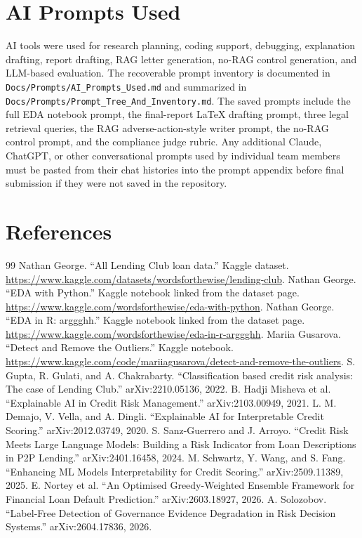 \documentclass[11pt]{article}
\begin{document}
\section{AI Prompts Used}
AI tools were used for research planning, coding support, debugging, explanation drafting, report drafting, RAG letter generation, no-RAG control generation, and LLM-based evaluation. The recoverable prompt inventory is documented in \texttt{Docs/Prompts/AI\_Prompts\_Used.md} and summarized in \texttt{Docs/Prompts/Prompt\_Tree\_And\_Inventory.md}. The saved prompts include the full EDA notebook prompt, the final-report LaTeX drafting prompt, three legal retrieval queries, the RAG adverse-action-style writer prompt, the no-RAG control prompt, and the compliance judge rubric. Any additional Claude, ChatGPT, or other conversational prompts used by individual team members must be pasted from their chat histories into the prompt appendix before final submission if they were not saved in the repository.

\section{References}
\begin{thebibliography}{99}
 Nathan George. ``All Lending Club loan data.'' Kaggle dataset. \url{https://www.kaggle.com/datasets/wordsforthewise/lending-club}.
 Nathan George. ``EDA with Python.'' Kaggle notebook linked from the dataset page. \url{https://www.kaggle.com/wordsforthewise/eda-with-python}.
 Nathan George. ``EDA in R: arggghh.'' Kaggle notebook linked from the dataset page. \url{https://www.kaggle.com/wordsforthewise/eda-in-r-arggghh}.
 Mariia Gusarova. ``Detect and Remove the Outliers.'' Kaggle notebook. \url{https://www.kaggle.com/code/mariiagusarova/detect-and-remove-the-outliers}.
 S. Gupta, R. Gulati, and A. Chakrabarty. ``Classification based credit risk analysis: The case of Lending Club.'' arXiv:2210.05136, 2022.
 B. Hadji Misheva et al. ``Explainable AI in Credit Risk Management.'' arXiv:2103.00949, 2021.
 L. M. Demajo, V. Vella, and A. Dingli. ``Explainable AI for Interpretable Credit Scoring.'' arXiv:2012.03749, 2020.
 S. Sanz-Guerrero and J. Arroyo. ``Credit Risk Meets Large Language Models: Building a Risk Indicator from Loan Descriptions in P2P Lending.'' arXiv:2401.16458, 2024.
 M. Schwartz, Y. Wang, and S. Fang. ``Enhancing ML Models Interpretability for Credit Scoring.'' arXiv:2509.11389, 2025.
 E. Nortey et al. ``An Optimised Greedy-Weighted Ensemble Framework for Financial Loan Default Prediction.'' arXiv:2603.18927, 2026.
 A. Solozobov. ``Label-Free Detection of Governance Evidence Degradation in Risk Decision Systems.'' arXiv:2604.17836, 2026.
\end{thebibliography}
\end{document}
